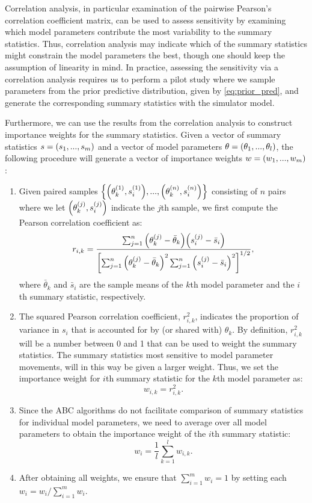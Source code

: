 Correlation analysis, in particular examination of the pairwise Pearson's correlation coefficient matrix, can be used to assess sensitivity by examining which model parameters contribute the most variability to the summary statistics. Thus, correlation analysis may indicate which of the summary statistics might constrain the model parameters the best, though one should keep the assumption of linearity in mind. In practice, assessing the sensitivity via a correlation analysis requires us to perform a pilot study where we sample parameters from the prior predictive distribution, given by \autoref{eq:prior_pred}, and generate the corresponding summary statistics with the simulator model.  

Furthermore, we can use the results from the correlation analysis to construct importance weights for the summary statistics. Given a vector of summary statistics $s = \qty(s_1, ..., s_m)$ and a vector of model parameters $\theta = \qty(\theta_1, ..., \theta_l)$, the following procedure will generate a vector of importance weights $w = \qty(w_1, ..., w_m)$: 
\begin{enumerate}
    \item Given paired samples $\qty{\qty(\theta_k^{(1)}, s_i^{(1)}), ..., \qty(\theta_k^{(n)}, s_i^{(n)})}$ consisting of $n$ pairs where we let $\qty(\theta_k^{(j)}, s_i^{(j)})$ indicate the $j$th sample, we first compute the Pearson correlation coefficient as:
    \begin{equation*}
    r_{i, k} = \frac{\sum_{j=1}^n \qty(\theta_k^{(j)} - \bar{\theta}_k) \qty(s_i^{(j)} - \bar{s}_i)}{\qty[\sum_{j=1}^n \qty(\theta_k^{(j)} - \bar{\theta}_k )^2 \sum_{j=1}^n \qty(s_i^{(j)} - \bar{s}_i )^2 ]^{1/2}},
    \end{equation*}
    where $\bar{\theta}_k$ and $\bar{s}_i$ are the sample means of the $k$th model parameter and the $i$th summary statistic, respectively.
    \item The squared Pearson correlation coefficient, $r_{i,k}^2$, indicates the proportion of variance in $s_{i}$ that is accounted for by (or shared with) $\theta_k$. By definition, $r_{i,k}^2$ will be a number between 0 and 1 that can be used to weight the summary statistics. The summary statistics most sensitive to model parameter movements, will in this way be given a larger weight. Thus, we set the importance weight for $i$th summary statistic for the $k$th model parameter as:
    \begin{equation*}
        w_{i, k} = r_{i, k}^2.
    \end{equation*}
    \item Since the ABC algorithms do not facilitate comparison of summary statistics for individual model parameters, we need to average over all model parameters to obtain the importance weight of the $i$th summary statistic:
    \begin{equation*}
        w_i = \frac{1}{l} \sum_{k=1}^l w_{i, k}.
    \end{equation*}
    \item After obtaining all weights, we ensure that $\sum_{i=1}^m w_i = 1$ by setting each $w_i = w_i / \sum_{i=1}^m w_i$.
\end{enumerate} 




